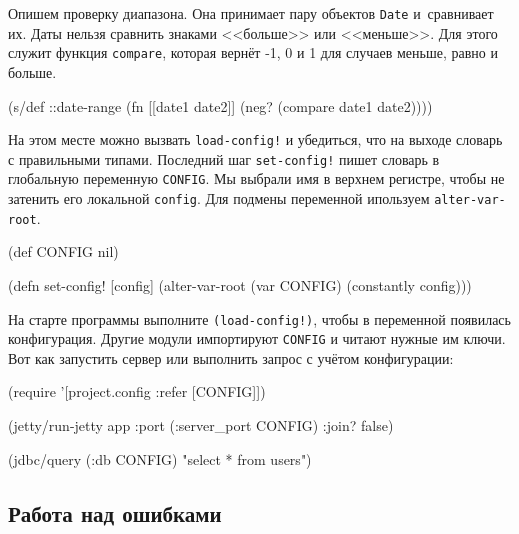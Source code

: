 
Опишем проверку диапазона. Она принимает пару объектов \verb|Date| и~сравнивает
их. Даты нельзя сравнить знаками <<больше>> или <<меньше>>. Для этого служит
функция \verb|compare|, которая вернёт -1, 0 и 1 для случаев меньше, равно и
больше.

\begin{english}
  \begin{clojure}
(s/def ::date-range
  (fn [[date1 date2]]
    (neg? (compare date1 date2))))
  \end{clojure}
\end{english}

На этом месте можно вызвать \verb|load-config!| и убедиться, что на выходе
словарь с правильными типами. Последний шаг \verb|set-config!| пишет словарь в
глобальную переменную \verb|CONFIG|. Мы выбрали имя в верхнем регистре, чтобы не
затенить его локальной \verb|config|. Для подмены переменной ипользуем
\verb|alter-var-root|.


\begin{english}
  \begin{clojure}
(def CONFIG nil)

(defn set-config!
  [config]
  (alter-var-root (var CONFIG) (constantly config)))
  \end{clojure}
\end{english}

На старте программы выполните \verb|(load-config!)|, чтобы в переменной
появилась конфигурация. Другие модули импортируют \verb|CONFIG| и читают
нужные им ключи. Вот как запустить сервер или выполнить запрос с учётом
конфигурации:


\begin{english}
  \begin{clojure}
(require '[project.config :refer [CONFIG]])

(jetty/run-jetty app {:port (:server_port CONFIG)
                      :join? false})

(jdbc/query (:db CONFIG) "select * from users")
  \end{clojure}
\end{english}

\subsection{Работа над ошибками}

